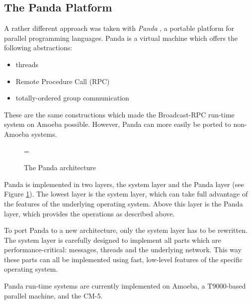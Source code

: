 \subsection{The Panda Platform}

A rather different approach was taken with {\em Panda} \cite{Panda},
a portable platform for parallel programming languages. Panda
is a virtual machine which offers the following abstractions:
\begin{itemize}
	\item threads
	\item Remote Procedure Call (RPC)
	\item totally-ordered group communication
\end{itemize}
These are the same constructions which made the Broadcast-RPC run-time
system on Amoeba possible. 
However, Panda can more easily be ported to non-Amoeba systems.

\begin{figure}
\epsfxsize=\textwidth
{}
\caption{The Panda architecture}
\label{fPanda}
\end{figure}

Panda is implemented in two layers, the system layer and the Panda
layer (see Figure \ref{fPanda}).
The lowest layer is the system layer,
which 
can take full advantage of the features of the underlying operating
system. Above this layer is the Panda layer, which provides the
operations as described above.

To port Panda to a new architecture, only the system layer has to be
rewritten. The system layer is carefully designed to implement all
parts which are performance-critical: messages, threads and the underlying
network. This way these parts can all be implemented using fast,
low-level features of the specific operating system.

Panda run-time systems are currently implemented on Amoeba, a
T9000-based parallel machine, and the CM-5.
